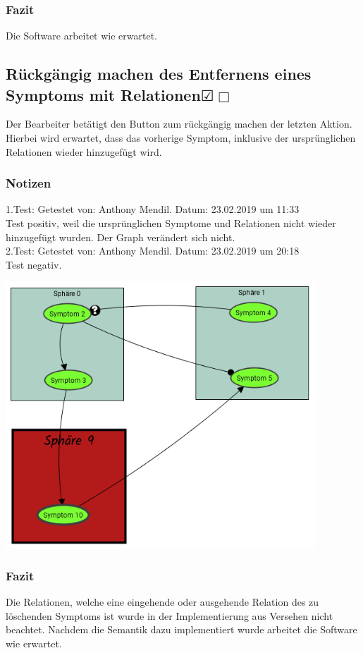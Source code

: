 \documentclass[enabledeprecatedfontcommands]{scrartcl}
\newcommand{\subsectiont}[2]{\subsection[#1]{#1{\normalsize\normalfont #2}}}
\newcommand{\leer}{$\Box$}
\newcommand{\ok}{$\CheckedBox$}
\begin{document}
\subsubsection{Fazit}
Die Software arbeitet wie erwartet. 

\subsectiont{Rückgängig machen des Entfernens eines \\Symptoms mit Relationen}{\dotfill\XBox\ok\leer}
Der Bearbeiter betätigt den Button zum rückgängig machen der letzten Aktion. Hierbei wird erwartet, dass das vorherige Symptom, inklusive der ursprünglichen Relationen wieder hinzugefügt wird. 
\subsubsection{Notizen}
1.Test: Getestet von: Anthony Mendil. Datum: 23.02.2019 um 11:33 \\
Test positiv, weil die ursprünglichen Symptome und Relationen nicht wieder hinzugefügt wurden. Der Graph verändert sich nicht. \\
2.Test: Getestet von: Anthony Mendil. Datum: 23.02.2019 um 20:18 \\
Test negativ.
\begin{center}
\includegraphics[height=10cm]{2_21.PNG}
\end{center}
\subsubsection{Fazit}
Die Relationen, welche eine eingehende oder ausgehende Relation des zu löschenden Symptoms ist wurde in der Implementierung aus Versehen nicht beachtet. Nachdem die Semantik dazu implementiert wurde arbeitet die Software wie erwartet. 
\end{document}
